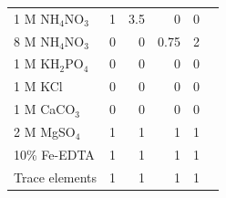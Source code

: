 \begin{table}[!h]
{\begin{tabular}{p{2.805cm}p{2cm}p{2cm}p{2cm}p{2cm}p{2cm}}
        1 M NH$_4$NO$_3$        & \multicolumn{1}{r}{1}         & \multicolumn{1}{r}{3.5}       & \multicolumn{1}{r}{0}         & \multicolumn{1}{r}{0}         &   \\
        8 M NH$_4$NO$_3$        & \multicolumn{1}{r}{0}         & \multicolumn{1}{r}{0}         & \multicolumn{1}{r}{0.75}      & \multicolumn{1}{r}{2}         &      \\
        1 M KH$_2$PO$_4$        & \multicolumn{1}{r}{0}         & \multicolumn{1}{r}{0}         & \multicolumn{1}{r}{0}         & \multicolumn{1}{r}{0}         &   \\
        1 M KCl                 & \multicolumn{1}{r}{0}         & \multicolumn{1}{r}{0}         & \multicolumn{1}{r}{0}         & \multicolumn{1}{r}{0}         &   \\
        1 M CaCO$_3$            & \multicolumn{1}{r}{0}         & \multicolumn{1}{r}{0}         & \multicolumn{1}{r}{0}         & \multicolumn{1}{r}{0}         &   \\
        2 M MgSO$_4$            & \multicolumn{1}{r}{1}         & \multicolumn{1}{r}{1}         & \multicolumn{1}{r}{1}         & \multicolumn{1}{r}{1}         &   \\
        10\% Fe-EDTA            & \multicolumn{1}{r}{1}         & \multicolumn{1}{r}{1}         & \multicolumn{1}{r}{1}         & \multicolumn{1}{r}{1}         &   \\
        Trace elements          & \multicolumn{1}{r}{1}         & \multicolumn{1}{r}{1}         & \multicolumn{1}{r}{1}         & \multicolumn{1}{r}{1}         &   \\
        \hline
\end{tabular}}
\end{table}
\clearpage

